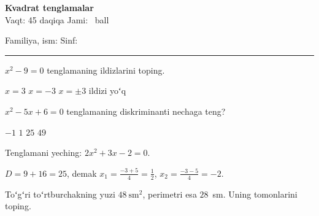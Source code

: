 \documentclass[12pt,a4paper,addpoints]{exam}
\begin{document}
\begin{center}
  {\Large\bfseries Kvadrat tenglamalar}\\[0.4em]
  Vaqt: 45 daqiqa \quad Jami: \numpoints\ ball
\end{center}

\vspace{0.5em}
\noindent Familiya, ism: \hrulefill\quad Sinf: \rule{3cm}{0.4pt}

\begin{center}
  \gradetable[h][questions]
\end{center}

\begin{questions}

\question[2] $x^2 - 9 = 0$ tenglamaning ildizlarini toping.
\begin{choices}
  \choice $x = 3$
  \choice $x = -3$
  \CorrectChoice $x = \pm 3$
  \choice ildizi yoʻq
\end{choices}

\question[2] $x^2 - 5x + 6 = 0$ tenglamaning diskriminanti nechaga teng?
\begin{oneparchoices}
  \choice $-1$
  \CorrectChoice $1$
  \choice $25$
  \choice $49$
\end{oneparchoices}

\question[3] Tenglamani yeching: $2x^2 + 3x - 2 = 0$.
\begin{solution}
  $D = 9 + 16 = 25$, demak $x_1 = \frac{-3 + 5}{4} = \frac12$, $x_2 = \frac{-3 - 5}{4} = -2$.
\end{solution}
\vspace{3cm}

\question[3] Toʻgʻri toʻrtburchakning yuzi $48\ \text{sm}^2$, perimetri esa $28$~sm.
Uning tomonlarini toping.
\vspace{3cm}

\end{questions}
\end{document}
